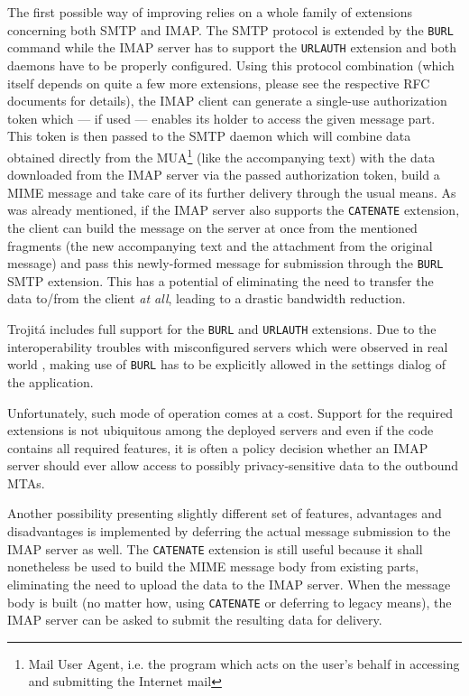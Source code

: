 \documentclass[trojita]{subfiles}
\begin{document}
The first possible way of improving relies on a whole family of extensions concerning both SMTP and IMAP.  The SMTP
protocol is extended by the {\tt BURL} command \cite{rfc4468} while the IMAP server has to support the {\tt URLAUTH}
extension \cite{rfc4467} and both daemons have to be properly configured.  Using this protocol combination (which itself
depends on quite a few more extensions, please see the respective RFC documents for details), the IMAP client can
generate a single-use authorization token which --- if used --- enables its holder to access the given message part.
This token is then passed to the SMTP daemon which will combine data obtained directly from the MUA\footnote{Mail User
Agent, i.e. the program which acts on the user's behalf in accessing and submitting the Internet mail} (like the
accompanying text) with the data downloaded from the IMAP server via the passed authorization token, build a MIME
message and take care of its further delivery through the usual means.  As was already mentioned, if the IMAP server
also supports the {\tt CATENATE} extension, the client can build the message on the server at once from the mentioned
fragments (the new accompanying text and the attachment from the original message) and pass this newly-formed message
for submission through the {\tt BURL} SMTP extension.  This has a potential of eliminating the need to transfer the data
to/from the client {\em at all}, leading to a drastic bandwidth reduction.

\begin{trojitabehavior}
Trojitá includes full support for the {\tt BURL} and {\tt URLAUTH} extensions.  Due to the interoperability troubles
with misconfigured servers which were observed in real world \cite{qmf-fastmail-burl-bug}, making use of {\tt BURL} has
to be explicitly allowed in the settings dialog of the application.
\end{trojitabehavior}

Unfortunately, such mode of operation comes at a cost.  Support for the required extensions is not
ubiquitous among the deployed servers and even if the code contains all required features, it is often a policy decision
whether an IMAP server should ever allow access to possibly privacy-sensitive data to the outbound MTAs.

Another possibility presenting slightly different set of features, advantages and disadvantages is implemented by
deferring the actual message submission to the IMAP server as well.  The {\tt CATENATE} extension is still useful
because it shall nonetheless be used to build the MIME message body from existing parts, eliminating the need to upload
the data to the IMAP server.  When the message body is built (no matter how, using {\tt CATENATE} or deferring to legacy
means), the IMAP server can be asked to submit the resulting data for delivery.
\end{document}

